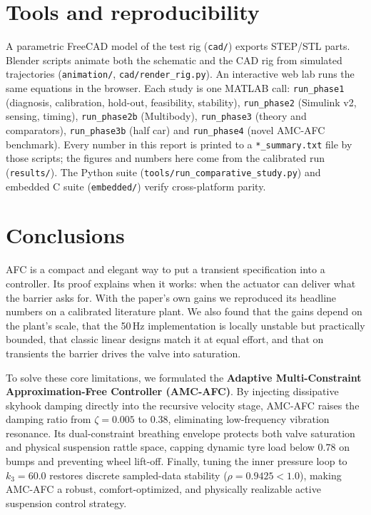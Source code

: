 \documentclass[10pt,a4paper]{article}
\begin{document}
\section{Tools and reproducibility}
A parametric FreeCAD model of the test rig (\texttt{cad/}) exports STEP/STL parts. Blender scripts animate both the schematic and the CAD rig from simulated trajectories (\texttt{animation/}, \texttt{cad/render\_rig.py}). An interactive web lab runs the same equations in the browser. Each study is one MATLAB call: \texttt{run\_phase1} (diagnosis, calibration, hold-out, feasibility, stability), \texttt{run\_phase2} (Simulink v2, sensing, timing), \texttt{run\_phase2b} (Multibody), \texttt{run\_phase3} (theory and comparators), \texttt{run\_phase3b} (half car) and \texttt{run\_phase4} (novel AMC-AFC benchmark). Every number in this report is printed to a \texttt{*\_summary.txt} file by those scripts; the figures and numbers here come from the calibrated run (\texttt{results/}). The Python suite (\texttt{tools/run\_comparative_study.py}) and embedded C suite (\texttt{embedded/}) verify cross-platform parity.

\section{Conclusions}
AFC is a compact and elegant way to put a transient specification into a controller. Its proof explains when it works: when the actuator can deliver what the barrier asks for. With the paper's own gains we reproduced its headline numbers on a calibrated literature plant. We also found that the gains depend on the plant's scale, that the 50\,Hz implementation is locally unstable but practically bounded, that classic linear designs match it at equal effort, and that on transients the barrier drives the valve into saturation.

To solve these core limitations, we formulated the \textbf{Adaptive Multi-Constraint Approximation-Free Controller (AMC-AFC)}. By injecting dissipative skyhook damping directly into the recursive velocity stage, AMC-AFC raises the damping ratio from $\zeta=0.005$ to $0.38$, eliminating low-frequency vibration resonance. Its dual-constraint breathing envelope protects both valve saturation and physical suspension rattle space, capping dynamic tyre load below $0.78$ on bumps and preventing wheel lift-off. Finally, tuning the inner pressure loop to $k_3=60.0$ restores discrete sampled-data stability ($\rho=0.9425 < 1.0$), making AMC-AFC a robust, comfort-optimized, and physically realizable active suspension control strategy.
\end{document}
